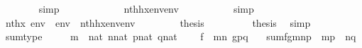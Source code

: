 \begin{isabellebody}
\ \ \ \ \ \ \isamarkupfalse%
\ simp\isanewline
\ \ \ \ \isamarkupfalse%
\isanewline
\ \ \ \ \isamarkupfalse%
\ {\isachardoublequoteopen}{\isachardot}{\kern0pt}{\isachardot}{\kern0pt}{\isachardot}{\kern0pt}\ {\isacharequal}{\kern0pt}\ nth{\isacharparenleft}{\kern0pt}{\isacharquery}{\kern0pt}h{\isacharbackquote}{\kern0pt}x{\isacharcomma}{\kern0pt}env{\isacharprime}{\kern0pt}{\isacharat}{\kern0pt}env{}{\isacharparenright}{\kern0pt}{\isachardoublequoteclose}\isanewline
\ \ \ \ \ \ \isamarkupfalse%
\ {}\ \isamarkupfalse%
\ simp\isanewline
\ \ \ \ \isamarkupfalse%
\isanewline
\ \ \ \ \isamarkupfalse%
\ {\isachardoublequoteopen}nth{\isacharparenleft}{\kern0pt}x{\isacharcomma}{\kern0pt}\ env\ {\isacharat}{\kern0pt}\ env{}{\isacharparenright}{\kern0pt}\ {\isacharequal}{\kern0pt}\ nth{\isacharparenleft}{\kern0pt}{\isacharquery}{\kern0pt}h{\isacharbackquote}{\kern0pt}x{\isacharcomma}{\kern0pt}env{\isacharprime}{\kern0pt}{\isacharat}{\kern0pt}env{}{\isacharparenright}{\kern0pt}{\isachardoublequoteclose}\ \isacommand{{\isachardot}{\kern0pt}}\isamarkupfalse%
\isanewline
\ \ \ \ \isamarkupfalse%
\ \isamarkupfalse%
\ {\isacharquery}{\kern0pt}thesis\ \isacommand{{\isachardot}{\kern0pt}}\isamarkupfalse%
\isanewline
\ \ \isamarkupfalse%
\isanewline
\ \ \isamarkupfalse%
\ \isamarkupfalse%
\ {\isacharquery}{\kern0pt}thesis\ \isamarkupfalse%
\ simp\isanewline
{}\isamarkupfalse%
%
\endisatagproof
{\isafoldproof}%
%
\isadelimproof
\isanewline
%
\endisadelimproof
\isanewline
{}\isamarkupfalse%
\ sum{\isacharunderscore}{\kern0pt}type\ \ {\isacharcolon}{\kern0pt}\isanewline
\ \ \ {\isachardoublequoteopen}m\ {\isasymin}\ nat{\isachardoublequoteclose}\ {\isachardoublequoteopen}n{\isasymin}nat{\isachardoublequoteclose}\ {\isachardoublequoteopen}p{\isasymin}nat{\isachardoublequoteclose}\ {\isachardoublequoteopen}q{\isasymin}nat{\isachardoublequoteclose}\isanewline
\ \ \ \ {\isachardoublequoteopen}f\ {\isasymin}\ m{\isasymrightarrow}n{\isachardoublequoteclose}\ {\isachardoublequoteopen}g{\isasymin}p{\isasymrightarrow}q{\isachardoublequoteclose}\isanewline
\ \ \ {\isachardoublequoteopen}sum{\isacharparenleft}{\kern0pt}f{\isacharcomma}{\kern0pt}g{\isacharcomma}{\kern0pt}m{\isacharcomma}{\kern0pt}n{\isacharcomma}{\kern0pt}p{\isacharparenright}{\kern0pt}\ {\isasymin}\ {\isacharparenleft}{\kern0pt}m{\isacharhash}{\kern0pt}{\isacharplus}{\kern0pt}p{\isacharparenright}{\kern0pt}\ {\isasymrightarrow}\ {\isacharparenleft}{\kern0pt}n{\isacharhash}{\kern0pt}{\isacharplus}{\kern0pt}q{\isacharparenright}{\kern0pt}{\isachardoublequoteclose}\isanewline

\end{isabellebody}
